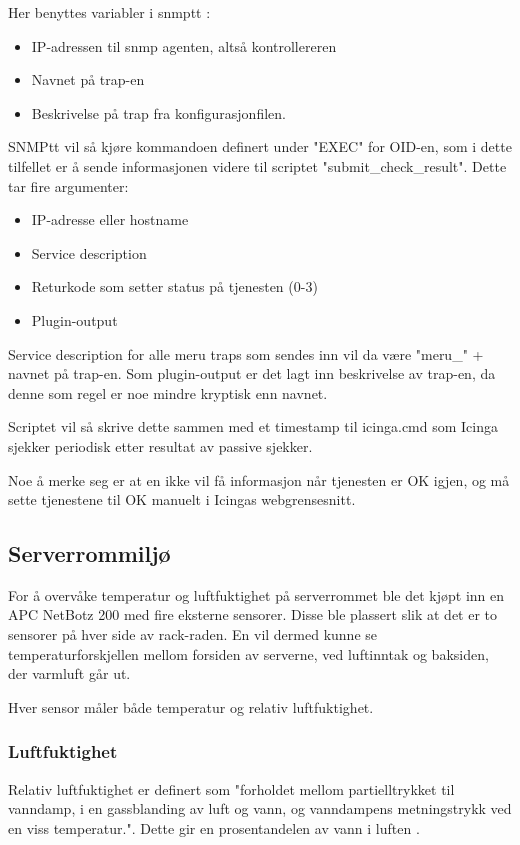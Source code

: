 Her benyttes variabler i snmptt \cite{snmptrans}:
\begin{itemize}
	\item IP-adressen til snmp agenten, altså kontrollereren
	\item Navnet på trap-en
	\item Beskrivelse på trap fra konfigurasjonfilen.
\end{itemize}

SNMPtt vil så kjøre kommandoen definert under "EXEC" for OID-en, som i dette tilfellet er å sende informasjonen videre til scriptet "submit\_check\_result". Dette tar fire argumenter:

\begin{itemize}
	\item IP-adresse eller hostname 
	\item Service description
	\item Returkode som setter status på tjenesten (0-3)
	\item Plugin-output
\end{itemize}

Service description for alle meru traps som sendes inn vil da være "meru\_" + navnet på trap-en. Som plugin-output er det lagt inn beskrivelse av trap-en, da denne som regel er noe mindre kryptisk enn navnet.

Scriptet vil så skrive dette sammen med et timestamp til icinga.cmd som Icinga sjekker periodisk etter resultat av passive sjekker.

Noe å merke seg er at en ikke vil få informasjon når tjenesten er OK igjen, og må sette tjenestene til OK manuelt i Icingas webgrensesnitt.

\subsection{Serverrommiljø}
For å overvåke temperatur og luftfuktighet på serverrommet ble det kjøpt inn en APC NetBotz 200 \cite{netbotz2} med fire eksterne sensorer. Disse ble plassert slik at det er to sensorer på hver side av rack-raden. En vil dermed kunne se temperaturforskjellen mellom forsiden av serverne, ved luftinntak og baksiden, der varmluft går ut.

Hver sensor måler både temperatur og relativ luftfuktighet.

\subsubsection{Luftfuktighet}
Relativ luftfuktighet er definert som "forholdet mellom partielltrykket til vanndamp, i en gassblanding av luft og vann, og vanndampens metningstrykk ved en viss temperatur.". Dette gir en prosentandelen av vann i luften \cite{wiki:luftfuktighet}. 


